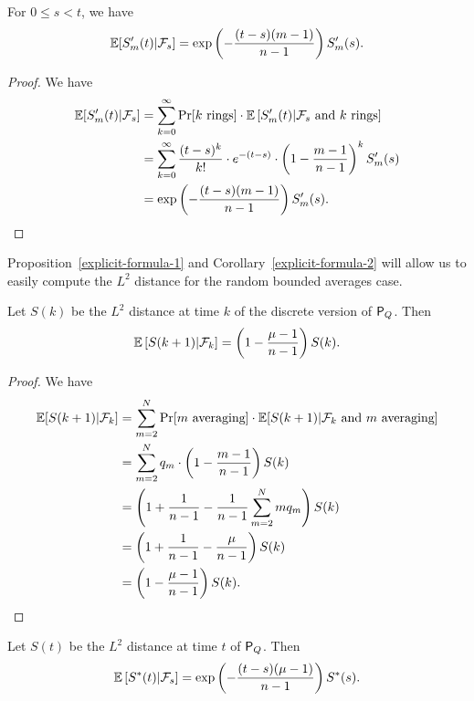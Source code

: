 \documentclass[12pt]{article}
\begin{document}
\begin{cor} \label{explicit-formula-2}
	For $0 \leq s < t$, we have 
	\[
		\mathbb{E} [S_m'(t) | \mathcal{F}_s] = \exp \left ( -\frac{(t-s)(m-1)}{n-1} \right ) S_m'(s).	
	\]
\end{cor}
\begin{proof}
	We have 
	\begin{align*}
		\mathbb{E} [ S_m'(t) | \mathcal{F}_s ] & = \sum_{k = 0}^\infty \Pr[k \text{ rings}] \cdot \mathbb{E} \left [ S_m'(t) | \mathcal{F}_s \text{ and } k \text{ rings} \right ] \\
		& = \sum_{k = 0}^\infty \frac{(t-s)^k}{k!} \cdot e^{-(t-s)} \cdot \left ( 1 - \frac{m-1}{n-1} \right )^k S_m'(s) \\
		& = \exp \left ( -\frac{(t-s)(m-1)}{n-1} \right ) S_m'(s). 
	\end{align*}
\end{proof}

Proposition~\ref{explicit-formula-1} and Corollary~\ref{explicit-formula-2} will allow us to easily compute the $L^2$ distance for the random bounded averages case. 

\begin{prop} \label{explicit-formula-discrete-YESYES}
	Let $S(k)$ be the $L^2$ distance at time $k$ of the discrete version of $\mathsf{P}_Q$. Then 
	\[
		\mathbb{E} \left [ S(k+1) | \mathcal{F}_k \right ] = \left ( 1 - \frac{\mu - 1}{n-1} \right ) S(k). 
	\]
\end{prop}
\begin{proof}
	We have 
	\begin{align*}
		\mathbb{E}[S(k+1) | \mathcal{F}_k] & = \sum_{m = 2}^N \Pr[m \text{ averaging}] \cdot \mathbb{E}[S(k+1) | \mathcal{F}_k \text{ and } m \text{ averaging}] \\
		& = \sum_{m = 2}^N q_m \cdot \left ( 1 - \frac{m -1}{n-1} \right ) S(k) \\
		& = \left ( 1 + \frac{1}{n-1} - \frac{1}{n-1} \sum_{m = 2}^N mq_m \right ) S(k) \\
		& = \left ( 1 + \frac{1}{n-1} - \frac{\mu}{n-1} \right ) S(k) \\
		& = \left ( 1 - \frac{\mu - 1}{n-1} \right ) S(k). 
	\end{align*}
\end{proof}

\begin{cor} \label{explicit-formula-continuous-YESYES}
	Let $S(t)$ be the $L^2$ distance at time $t$ of $\mathsf{P}_Q$. Then 
	\[
		\mathbb{E} \left [ S^*(t) | \mathcal{F}_s \right ] = \exp \left ( - \frac{(t-s)(\mu - 1)}{n-1} \right ) S^*(s).
	\]
\end{cor}
\end{document}
